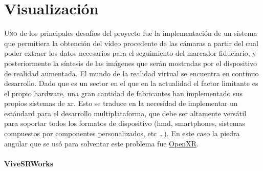 \chapter{Visualización}
\label{chap:visualización}
\lettrine{U}{no} de los principales desafíos del proyecto fue la implementación de un sistema que permitiera la obtención del vídeo procedente de las cámaras a partir del cual poder extraer los datos necesarios para el seguimiento del marcador fiduciario, y posteriormente la síntesis de las imágenes que serán mostradas por el dispositivo de realidad aumentada.
El mundo de la realidad virtual se encuentra en continuo desarrollo. Dado que es un sector en el que en la actualidad el factor limitante es el propio hardware, una gran cantidad de fabricantes han implementado sus propios sistemas de \acrfull{xr}. Esto se traduce en la necesidad de implementar un estándard para el desarrollo multiplataforma, que debe ser altamente versátil para soportar todos los formatos de dispositivo (\acrshort{hmd}, smartphones, sistemas compuestos por componentes personalizados, etc \dots). En este caso la piedra angular que se usó para solventar este problema fue \href{https://www.khronos.org/api/index_2017/openxr}{OpenXR}.

\subsubsection{ViveSRWorks}

